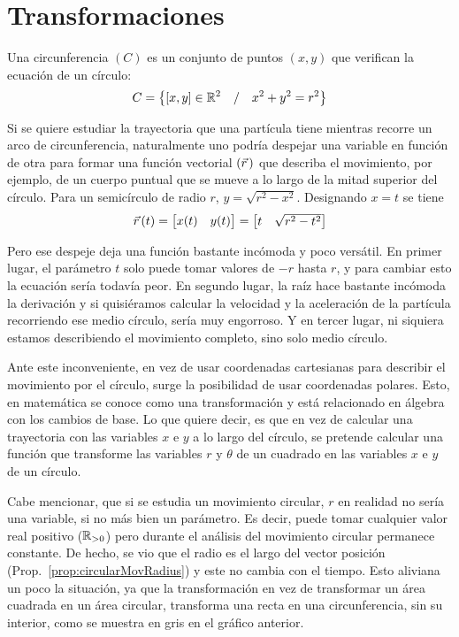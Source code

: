 \section{Transformaciones}

Una circunferencia $(C)$ es un conjunto de puntos $(x,y)$ que verifican la ecuación de un círculo:
\[
    C = \left\{ [x,y] \in \mathbb{R}^2 \quad / \quad x^2 + y^2 = r^2 \right\}
\]

Si se quiere estudiar la trayectoria que una partícula tiene mientras recorre un arco de circunferencia, naturalmente uno podría despejar una variable en función de otra para formar una función vectorial $(\vec{r}\hspace{0.05cm})$ que describa el movimiento, por ejemplo, de un cuerpo puntual que se mueve a lo largo de la mitad superior del círculo.
Para un semicírculo de radio $r$, $y = \sqrt{r^2 - x^2}$.
Designando $x = t$ se tiene
\[
    \vec{r}\hspace{0.05cm}(t) = \begin{bmatrix} x(t) & y(t) \end{bmatrix} = \begin{bmatrix} t & \sqrt{r^2-t^2} \end{bmatrix}
\]

Pero ese despeje deja una función bastante incómoda y poco versátil.
En primer lugar, el parámetro $t$ solo puede tomar valores de $-r$ hasta $r$, y para cambiar esto la ecuación sería todavía peor.
En segundo lugar, la raíz hace bastante incómoda la derivación y si quisiéramos calcular la velocidad y la aceleración de la partícula recorriendo ese medio círculo, sería muy engorroso.
Y en tercer lugar, ni siquiera estamos describiendo el movimiento completo, sino solo medio círculo.

Ante este inconveniente, en vez de usar coordenadas cartesianas para describir el movimiento por el círculo, surge la posibilidad de usar coordenadas polares.
Esto, en matemática se conoce como una transformación y está relacionado en álgebra con los cambios de base.
Lo que quiere decir, es que en vez de calcular una trayectoria con las variables $x$ e $y$ a lo largo del círculo, se pretende calcular una función que transforme las variables $r$ y $\theta$ de un cuadrado en las variables $x$ e $y$ de un círculo.

\begin{center}
    \def\svgwidth{\linewidth}
    
\end{center}

Cabe mencionar, que si se estudia un movimiento circular, $r$ en realidad no sería una variable, si no más bien un parámetro.
Es decir, puede tomar cualquier valor real positivo ($\mathbb{R}_{> 0}$) pero durante el análisis del movimiento circular permanece constante.
De hecho, se vio que el radio es el largo del vector posición (Prop.\ \ref{prop:circularMovRadius}) y este no cambia con el tiempo.
Esto aliviana un poco la situación, ya que la transformación en vez de transformar un área cuadrada en un área circular, transforma una recta en una circunferencia, sin su interior, como se muestra en gris en el gráfico anterior.

